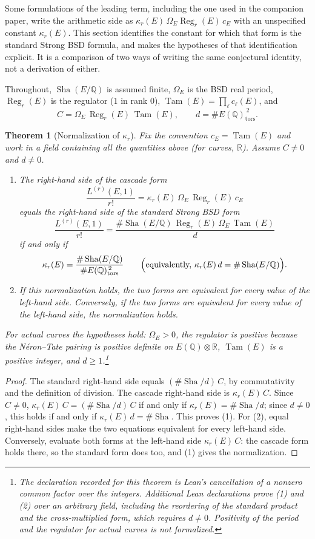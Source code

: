 \documentclass[11pt]{article}
\newtheorem{theorem}{Theorem}[section]
\theoremstyle{definition}
\newcommand{\Q}{\mathbb{Q}}
\newcommand{\R}{\mathbb{R}}
\newcommand{\Sha}{\operatorname{Sha}}
\newcommand{\Reg}{\operatorname{Reg}}
\newcommand{\Tam}{\operatorname{Tam}}
\newcommand{\tors}{\operatorname{tors}}
\newcommand{\kapr}{\kappa_r}
\begin{document}
Some formulations of the leading term, including the one used in the
companion paper, write the arithmetic side as
$\kapr(E)\,\Omega_E\Reg_r(E)\,c_E$ with an unspecified constant
$\kapr(E)$.  This section identifies the constant for which that form is
the standard Strong BSD formula, and makes the hypotheses of that
identification explicit.  It is a comparison of two ways of writing the
same conjectural identity, not a derivation of either.

Throughout, $\Sha(E/\Q)$ is assumed finite, $\Omega_E$ is the BSD real
period, $\Reg_r(E)$ is the regulator ($1$ in rank $0$), $\Tam(E)=\prod_\ell
c_\ell(E)$, and
\[
  C=\Omega_E\,\Reg_r(E)\,\Tam(E),
  \qquad
  d=\#E(\Q)_{\tors}^{\,2}.
\]

\begin{theorem}[Normalization of $\kapr$]\label{thm:apparatus:kappa-r-normalization-equivalence}
Fix the convention $c_E=\Tam(E)$ and work in a field containing all the
quantities above (for curves, $\R$).  Assume $C\neq0$ and $d\neq0$.
\begin{enumerate}
\item The right-hand side of the cascade form
  \[
    \frac{L^{(r)}(E,1)}{r!}=\kapr(E)\,\Omega_E\,\Reg_r(E)\,c_E
  \]
  equals the right-hand side of the standard Strong BSD form
  \[
    \frac{L^{(r)}(E,1)}{r!}
    =\frac{\#\Sha(E/\Q)\,\Reg_r(E)\,\Omega_E\,\Tam(E)}{d}
  \]
  if and only if
  \[
    \kapr(E)=\frac{\#\Sha(E/\Q)}{\#E(\Q)_{\tors}^{\,2}}
    \qquad\Bigl(\text{equivalently, } \kapr(E)\,d=\#\Sha(E/\Q)\Bigr).
  \]
\item If this normalization holds, the two forms are equivalent for every
  value of the left-hand side.  Conversely, if the two forms are
  equivalent for every value of the left-hand side, the normalization
  holds.
\end{enumerate}
For actual curves the hypotheses hold: $\Omega_E>0$, the regulator is
positive because the N\'eron--Tate pairing is positive definite on
$E(\Q)\otimes\R$, $\Tam(E)$ is a positive integer, and $d\ge1$.\footnote{The declaration recorded for this theorem is Lean's cancellation
of a nonzero common factor over the integers.  Additional Lean
declarations prove (1) and (2) over an arbitrary field, including the
reordering of the standard product and the cross-multiplied form, which
requires $d\neq0$.  Positivity of the period and the regulator for actual
curves is not formalized.}
\end{theorem}

\begin{proof}
The standard right-hand side equals $(\#\Sha/d)\,C$, by commutativity and
the definition of division.  The cascade right-hand side is
$\kapr(E)\,C$.  Since $C\neq0$, $\kapr(E)\,C=(\#\Sha/d)\,C$ if and only if
$\kapr(E)=\#\Sha/d$; since $d\neq0$, this holds if and only if
$\kapr(E)\,d=\#\Sha$.  This proves (1).  For (2), equal right-hand sides
make the two equations equivalent for every left-hand side.  Conversely,
evaluate both forms at the left-hand side $\kapr(E)\,C$: the cascade form
holds there, so the standard form does too, and (1) gives the
normalization.
\end{proof}
\end{document}
